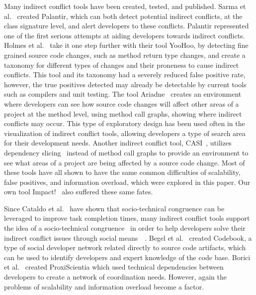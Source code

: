 \documentclass[conference]{IEEEtran}
\begin{document}
Many indirect conflict tools have been created, tested, and published. Sarma et al.~\cite{Sarma:2007:TSA} created Palantir,
which can both detect potential indirect conflicts, at the class signature level, and alert developers to these conflicts.
Palantir represented one of the first serious attempts at aiding developers towards indirect conflicts. Holmes et
al.~\cite{Holmes:2010:CAR} take it one step further with their tool YooHoo, by detecting fine grained source code changes,
such as method return type changes, and create a taxonomy for different types of changes and their proneness to cause
indirect conflicts. This tool and its taxonomy had a severely reduced false positive rate, however, the true positives
detected may already be detectable by current tools such as compilers and unit testing. The tool Ariadne~\cite{Trainer:2005:BGT}
creates an environment where developers can see how source code changes will affect other areas of a project at the
method level, using method call graphs, showing where indirect conflicts may occur. This type of exploratory design has
been used often in the visualization of indirect conflict tools, allowing developers a type of search area for their development
needs. Another indirect conflict tool, CASI~\cite{Servant:2010:CPI}, utilizes dependency slicing~\cite{Bajracharya:2009:SIS}
instead of method call graphs to provide an environment to see what areas of a project are being affected by a source code change.
Most of these tools have all shown to have the same common difficulties of scalability, false positives, and information overload,
which were explored in this paper. Our own tool
Impact!~\cite{Ell:2013} also suffered these same fates.

Since Cataldo et al.~\cite{Cataldo:2006:ICR} have shown that socio-technical congruence can be leveraged to improve task completion
times, many indirect conflict tools support the idea of a socio-technical congruence~\cite{Kwan:2011:ESC} in order to help
developers solve their indirect conflict issues through social means~\cite{Begel:2010:CDE}~\cite{Borici:2012:CHA}.
Begel et al.~\cite{Begel:2010:CDE} created Codebook, a type of social developer network related directly to source code
artifacts, which can be used to identify developers and expert knowledge of the code base. Borici et al.~\cite{Borici:2012:CHA}
created ProxiScientia which used technical dependencies between developers to create a network of coordination needs.
However, again the problems of scalability and information overload become a factor.
\end{document}
